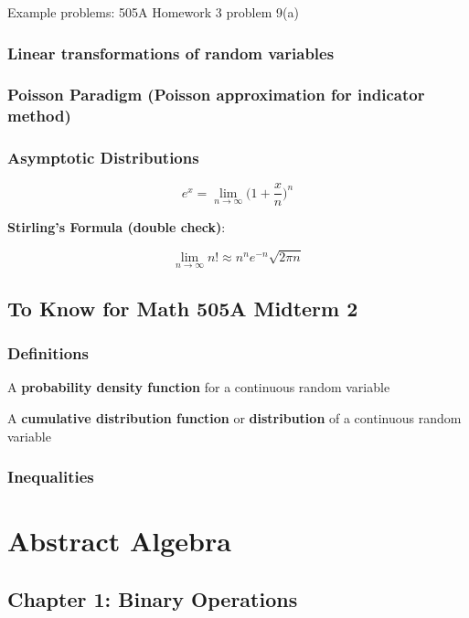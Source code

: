 \documentclass{article}
\begin{document}
Example problems: 505A Homework 3 problem 9(a)

\subsubsection{Linear transformations of random variables}

\subsubsection{Poisson Paradigm (Poisson approximation for indicator method)}

\subsubsection{Asymptotic Distributions}

\[
e^x = \lim_{n \to \infty} \bigg( 1 + \frac{x}{n}\bigg)^n
\]

\textbf{Stirling's Formula (double check)}: 

\[
\lim_{n \to \infty} n! \approx n^ne^{-n} \sqrt{2\pi n}
\]

\subsection{To Know for Math 505A Midterm 2}

\subsubsection{Definitions}

A \textbf{probability density function} for a continuous random variable 

A \textbf{cumulative distribution function} or \textbf{distribution} of a continuous random variable

\subsubsection{Inequalities}

\pagebreak


\section{Abstract Algebra}

\subsection{Chapter 1: Binary Operations}
\end{document}
